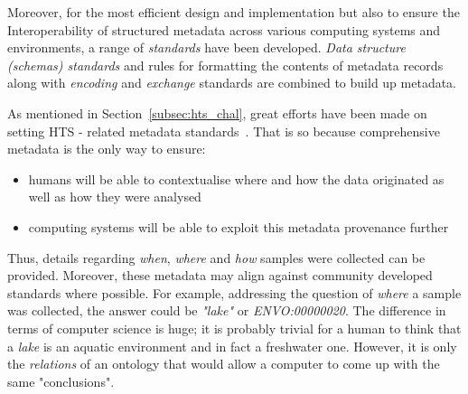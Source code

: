       Moreover, for the most efficient design and implementation 
      but also to ensure the Interoperability of structured metadata 
      across various computing systems and environments, 
      a range of \textit{standards} have been developed.  
      \textit{Data structure (schemas) standards} and
      rules for formatting the contents of metadata records 
      along with
      \textit{encoding} and \textit{exchange} standards 
      are combined to build up metadata.

      As mentioned in Section~\ref{subsec:hts_chal}, great efforts have been 
      made on setting 
      HTS - related metadata standards~\cite{yilmaz2011minimum, yilmaz2011genomic, wood2020national}.
      That is so because comprehensive metadata is the only 
      way to ensure:
      \begin{itemize}
         \setlength\itemsep{0.05em}
         \item humans will be able to contextualise where and how the data originated as well as how they were analysed
         \item computing systems will be able to exploit this metadata provenance further
      \end{itemize} 
      Thus, 
      details regarding \textit{when}, \textit{where} and \textit{how} samples were collected 
      can be provided. 
      Moreover, these metadata may align against community developed standards where possible. 
      For example, addressing the question of \textit{where} a sample was collected, 
      the answer could be \textit{"lake"} or \textit{ENVO:00000020}.
      The difference in terms of computer science is huge; 
      it is probably trivial for a human to think that a \textit{lake} is an aquatic
      environment and in fact a freshwater one. 
      However, it is only the \textit{relations} of an ontology that would allow 
      a computer to come up with the same "conclusions". 



